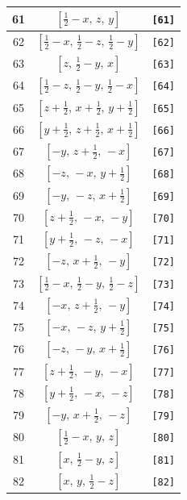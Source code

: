 \documentclass[fleqn,8pt]{jsarticle}
\begin{document}
\begin{longtable}{ccc}
61 & $\left[ \frac{1}{2} - x,\, z,\, y \right]$ & {\tt [61]} \\ \hline
62 & $\left[ \frac{1}{2} - x,\, \frac{1}{2} - z,\, \frac{1}{2} - y \right]$ & {\tt [62]} \\ \hline
63 & $\left[ z,\, \frac{1}{2} - y,\, x \right]$ & {\tt [63]} \\ \hline
64 & $\left[ \frac{1}{2} - z,\, \frac{1}{2} - y,\, \frac{1}{2} - x \right]$ & {\tt [64]} \\ \hline
65 & $\left[ z + \frac{1}{2},\, x + \frac{1}{2},\, y + \frac{1}{2} \right]$ & {\tt [65]} \\ \hline
66 & $\left[ y + \frac{1}{2},\, z + \frac{1}{2},\, x + \frac{1}{2} \right]$ & {\tt [66]} \\ \hline
67 & $\left[ - y,\, z + \frac{1}{2},\, - x \right]$ & {\tt [67]} \\ \hline
68 & $\left[ - z,\, - x,\, y + \frac{1}{2} \right]$ & {\tt [68]} \\ \hline
69 & $\left[ - y,\, - z,\, x + \frac{1}{2} \right]$ & {\tt [69]} \\ \hline
70 & $\left[ z + \frac{1}{2},\, - x,\, - y \right]$ & {\tt [70]} \\ \hline
71 & $\left[ y + \frac{1}{2},\, - z,\, - x \right]$ & {\tt [71]} \\ \hline
72 & $\left[ - z,\, x + \frac{1}{2},\, - y \right]$ & {\tt [72]} \\ \hline
73 & $\left[ \frac{1}{2} - x,\, \frac{1}{2} - y,\, \frac{1}{2} - z \right]$ & {\tt [73]} \\ \hline
74 & $\left[ - x,\, z + \frac{1}{2},\, - y \right]$ & {\tt [74]} \\ \hline
75 & $\left[ - x,\, - z,\, y + \frac{1}{2} \right]$ & {\tt [75]} \\ \hline
76 & $\left[ - z,\, - y,\, x + \frac{1}{2} \right]$ & {\tt [76]} \\ \hline
77 & $\left[ z + \frac{1}{2},\, - y,\, - x \right]$ & {\tt [77]} \\ \hline
78 & $\left[ y + \frac{1}{2},\, - x,\, - z \right]$ & {\tt [78]} \\ \hline
79 & $\left[ - y,\, x + \frac{1}{2},\, - z \right]$ & {\tt [79]} \\ \hline
80 & $\left[ \frac{1}{2} - x,\, y,\, z \right]$ & {\tt [80]} \\ \hline
81 & $\left[ x,\, \frac{1}{2} - y,\, z \right]$ & {\tt [81]} \\ \hline
82 & $\left[ x,\, y,\, \frac{1}{2} - z \right]$ & {\tt [82]} \\ \hline

\end{longtable}
\end{document}
